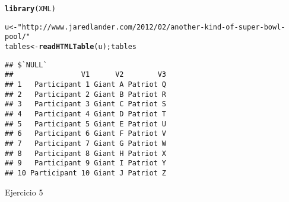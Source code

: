 \documentclass{article}\usepackage[]{graphicx}\usepackage[]{color}
\makeatletter
\newcommand{\hlstr}[1]{\textcolor[rgb]{0.192,0.494,0.8}{#1}}%
\newcommand{\hlstd}[1]{\textcolor[rgb]{0.345,0.345,0.345}{#1}}%
\newcommand{\hlkwb}[1]{\textcolor[rgb]{0.69,0.353,0.396}{#1}}%
\newcommand{\hlkwd}[1]{\textcolor[rgb]{0.737,0.353,0.396}{\textbf{#1}}}%
\newenvironment{kframe}{%
 \def\at@end@of@kframe{}%
 \ifinner\ifhmode%
  \def\at@end@of@kframe{\end{minipage}}%
  \begin{minipage}{\columnwidth}%
 \fi\fi%
 \def\FrameCommand##1{\hskip\@totalleftmargin \hskip-\fboxsep
 \colorbox{shadecolor}{##1}\hskip-\fboxsep
     \hskip-\linewidth \hskip-\@totalleftmargin \hskip\columnwidth}%
 \MakeFramed {\advance\hsize-\width
   \@totalleftmargin\z@ \linewidth\hsize
   \@setminipage}}%
 {\par\unskip\endMakeFramed%
 \at@end@of@kframe}
\newenvironment{knitrout}{}{} %
\makeatother
\begin{document}
\begin{knitrout}
\color{fgcolor}\begin{kframe}
\begin{alltt}
\hlkwd{library}\hlstd{(XML)}
\end{alltt}


{\ttfamily\noindent\color{warningcolor}{\#\# Warning: package 'XML' was built under R version 3.2.2}}\begin{alltt}
\hlstd{u}\hlkwb{<-}\hlstr{"http://www.jaredlander.com/2012/02/another-kind-of-super-bowl-pool/"}
\hlstd{tables} \hlkwb{<-} \hlkwd{readHTMLTable}\hlstd{(u);tables}
\end{alltt}
\begin{verbatim}
## $`NULL`
##                V1      V2        V3
## 1   Participant 1 Giant A Patriot Q
## 2   Participant 2 Giant B Patriot R
## 3   Participant 3 Giant C Patriot S
## 4   Participant 4 Giant D Patriot T
## 5   Participant 5 Giant E Patriot U
## 6   Participant 6 Giant F Patriot V
## 7   Participant 7 Giant G Patriot W
## 8   Participant 8 Giant H Patriot X
## 9   Participant 9 Giant I Patriot Y
## 10 Participant 10 Giant J Patriot Z
\end{verbatim}
\end{kframe}
\end{knitrout}
Ejercicio 5\\
\\
\end{document}
